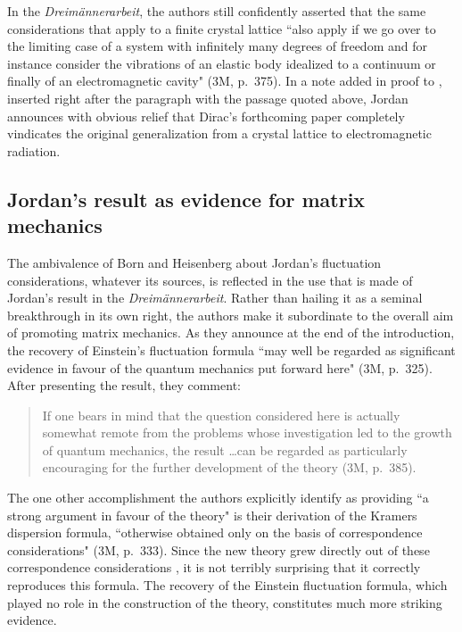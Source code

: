 \documentclass{elsart}
\begin{document}
In the {\it Dreim\"annerarbeit}, the authors still confidently asserted that the same considerations that apply to a finite crystal lattice ``also apply if we go over to the limiting case of a system with infinitely many degrees of freedom and for instance consider the vibrations of an elastic body idealized to a continuum or finally of an electromagnetic cavity" (3M, p.\ 375). In a note added in proof to \citep{Jordan 1927b}, inserted right after the paragraph with the passage quoted above,  Jordan announces with obvious relief that Dirac's forthcoming paper completely vindicates the original generalization from a crystal lattice to electromagnetic radiation.

\subsection{Jordan's result as evidence for matrix mechanics}

The ambivalence of Born and Heisenberg about Jordan's fluctuation considerations, whatever its sources, is reflected in the use that is made of Jordan's result in the {\it Dreim\"annerarbeit}. Rather than hailing it as a seminal breakthrough in its own right, the authors make it subordinate to the overall aim of promoting matrix mechanics. As they announce at the end of the introduction, the recovery of Einstein's fluctuation formula ``may well be regarded as significant evidence in favour of the quantum mechanics put forward here" (3M, p.\ 325). After presenting the result, they comment: 
\begin{quotation}
If one bears in mind that the question considered here is actually somewhat remote from the problems whose investigation led to the growth of quantum mechanics, the result \ldots can be regarded as particularly encouraging for the further development of the theory (3M, p.\ 385). 
\end{quotation}
The one other accomplishment the authors explicitly identify as providing ``a strong argument in favour of the theory" is their derivation of the Kramers dispersion formula, ``otherwise obtained only on the basis of correspondence considerations" (3M, p.\ 333).  Since the new theory grew directly out of these correspondence considerations \citep{Duncan and Janssen}, it is not terribly surprising that it correctly reproduces this formula. The recovery of the Einstein fluctuation formula, which played no role in the construction of the theory, constitutes much more striking evidence.
\end{document}
